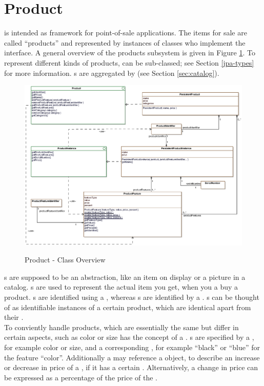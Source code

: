 \section{Product}
\label{sec:product}
\salespoint{} is intended as framework for point-of-sale applications.
The items for sale are called ``products'' and represented by instances of classes who implement the  interface.
A general overview of the \salespoint{} products subsystem is given in Figure \ref{product_overview}.
To represent different kinds of products,  can be sub-classed; see Section \ref{jpa-types} for more information.
s are aggregated by  (see Section \ref{sec:catalog}).

\begin{figure}
	\centering
  \includegraphics[width=1.0\textwidth]{images/Product_Overview.eps}
	\label{product_overview}
	\caption{Product - Class Overview}
\end{figure}

s are supposed to be an abstraction, like an item on display or a picture in a catalog.
s are used to represent the actual item you get, when you a buy a product.
s are identified using a , whereas s are identified by a .
s can be thought of as identifiable instances of a certain product, which are identical apart from their .
\\

To conviently handle products, which are essentially the same but differ in certain aspects, such as color or size \salespoint{} has the concept of a .
s are specified by a , for example color or size, and a corresponding , for example ``black'' or ``blue'' for the feature ``color''.
Additionally a  may reference a  object, to describe an increase or decrease in price of a , if it has a certain .
Alternatively, a change in price can be expressed as a percentage of the price of the .

